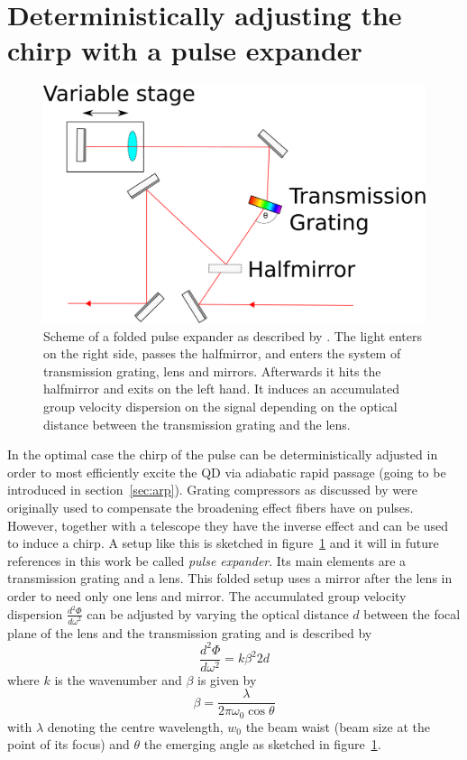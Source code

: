 \section{Deterministically adjusting the chirp with a pulse expander}
\label{sec:pulse-expander}
\begin{figure}[H]
	\centering
	\includegraphics[width=0.7\linewidth]{figures/chirp/pulse-expander}
	\caption{Scheme of a folded pulse expander as described by \textcite{martinez_3000_1987}.
		The light enters on the right side, passes the halfmirror, and enters the system of transmission grating, lens and mirrors.
		Afterwards it hits the halfmirror and exits on the left hand.
		It induces an accumulated group velocity dispersion on the signal depending on the optical distance between the transmission grating and the lens.}
	\label{fig:pulse-expander}
\end{figure}



In the optimal case the chirp of the pulse can be deterministically adjusted in order to most efficiently excite the \ac{QD} via adiabatic rapid passage (going to be introduced in section~\ref{sec:arp}).
Grating compressors as discussed by \textcite{martinez_3000_1987} were originally used to compensate the broadening effect fibers have on pulses.
However, together with a telescope they have the inverse effect and can be used to induce a chirp.
A setup like this is sketched in figure~\ref{fig:pulse-expander} and it will in future references in this work be called \textit{pulse expander}.
Its main elements are a transmission grating and a lens.
This folded setup uses a mirror after the lens in order to need only one lens and mirror.
The accumulated group velocity dispersion $\frac{d^2 \Phi}{d \omega^2}$ can be adjusted by varying the optical distance $d$ between the focal plane of the lens and the transmission grating and is described by
\begin{equation}
\frac{d^2 \Phi}{d \omega^2} = k \beta^2 2 d
\end{equation}
where $k$ is the wavenumber and $\beta$ is given by
\begin{equation}
\beta = \frac{\lambda}{2 \pi \omega_0 \cos \theta}
\end{equation}
with $\lambda$ denoting the centre wavelength, $w_0$ the beam waist (beam size at the point of its focus) and $\theta$ the emerging angle as sketched in figure~\ref{fig:pulse-expander}.

